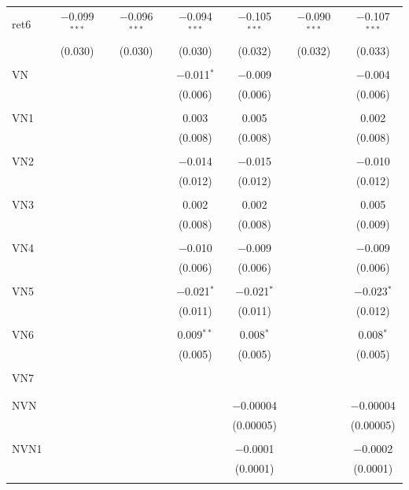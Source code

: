 \begin{table}[!htbp]
\begin{tabular}{@{\extracolsep{5pt}}lcccccc}
 ret6 & $-$0.099$^{***}$ & $-$0.096$^{***}$ & $-$0.094$^{***}$ & $-$0.105$^{***}$ & $-$0.090$^{***}$ & $-$0.107$^{***}$ \\ 
  & (0.030) & (0.030) & (0.030) & (0.032) & (0.032) & (0.033) \\ 
  & & & & & & \\ 
 VN &  &  & $-$0.011$^{*}$ & $-$0.009 &  & $-$0.004 \\ 
  &  &  & (0.006) & (0.006) &  & (0.006) \\ 
  & & & & & & \\ 
 VN1 &  &  & 0.003 & 0.005 &  & 0.002 \\ 
  &  &  & (0.008) & (0.008) &  & (0.008) \\ 
  & & & & & & \\ 
 VN2 &  &  & $-$0.014 & $-$0.015 &  & $-$0.010 \\ 
  &  &  & (0.012) & (0.012) &  & (0.012) \\ 
  & & & & & & \\ 
 VN3 &  &  & 0.002 & 0.002 &  & 0.005 \\ 
  &  &  & (0.008) & (0.008) &  & (0.009) \\ 
  & & & & & & \\ 
 VN4 &  &  & $-$0.010 & $-$0.009 &  & $-$0.009 \\ 
  &  &  & (0.006) & (0.006) &  & (0.006) \\ 
  & & & & & & \\ 
 VN5 &  &  & $-$0.021$^{*}$ & $-$0.021$^{*}$ &  & $-$0.023$^{*}$ \\ 
  &  &  & (0.011) & (0.011) &  & (0.012) \\ 
  & & & & & & \\ 
 VN6 &  &  & 0.009$^{**}$ & 0.008$^{*}$ &  & 0.008$^{*}$ \\ 
  &  &  & (0.005) & (0.005) &  & (0.005) \\ 
  & & & & & & \\ 
 VN7 &  &  &  &  &  &  \\ 
  &  &  &  &  &  &  \\ 
  & & & & & & \\ 
 NVN &  &  &  & $-$0.00004 &  & $-$0.00004 \\ 
  &  &  &  & (0.00005) &  & (0.00005) \\ 
  & & & & & & \\ 
 NVN1 &  &  &  & $-$0.0001 &  & $-$0.0002 \\ 
  &  &  &  & (0.0001) &  & (0.0001) \\ 
  & & & & & & \\ 

\end{tabular}
\end{table}
